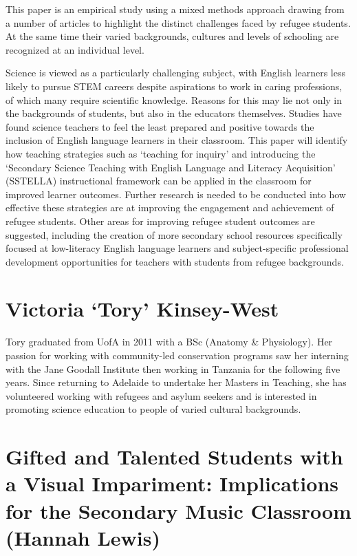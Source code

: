\documentclass[twoside,14pt,a4paper,notitlepage]{memoir}
\begin{document}
This paper is an empirical study using a mixed methods approach drawing from a number of articles to highlight the distinct challenges faced by refugee students.  At the same time their varied backgrounds, cultures and levels of schooling are recognized at an individual level. 
 
Science is viewed as a particularly challenging subject, with English learners less likely to pursue STEM careers despite aspirations to work in caring professions, of which many require scientific knowledge. Reasons for this may lie not only in the backgrounds of students, but also in the educators themselves.  Studies have found science teachers to feel the least prepared and positive towards the inclusion of English language learners in their classroom.  This paper will identify how teaching strategies such as ‘teaching for inquiry’ and introducing the ‘Secondary Science Teaching with English Language and Literacy Acquisition’ (SSTELLA) instructional framework can be applied in the classroom for improved learner outcomes.  Further research is needed to be conducted into how effective these strategies are at improving the engagement and achievement of refugee students.  Other areas for improving refugee student outcomes are suggested, including the creation of more secondary school resources specifically focused at low-literacy English language learners and subject-specific professional development opportunities for teachers with students from refugee backgrounds.

\section*{Victoria `Tory' Kinsey-West}

Tory graduated from UofA in 2011 with a BSc (Anatomy \& Physiology).  Her passion for working with community-led conservation programs saw her interning with the Jane Goodall Institute then working in Tanzania for the following five years. Since returning to Adelaide to undertake her Masters in Teaching, she has volunteered working with refugees and asylum seekers and is interested in promoting science education to people of varied cultural backgrounds.    



\section*{Gifted and Talented Students with a Visual Impariment: Implications for the Secondary Music Classroom (Hannah Lewis)}
\label{aut:lewis}
\end{document}

